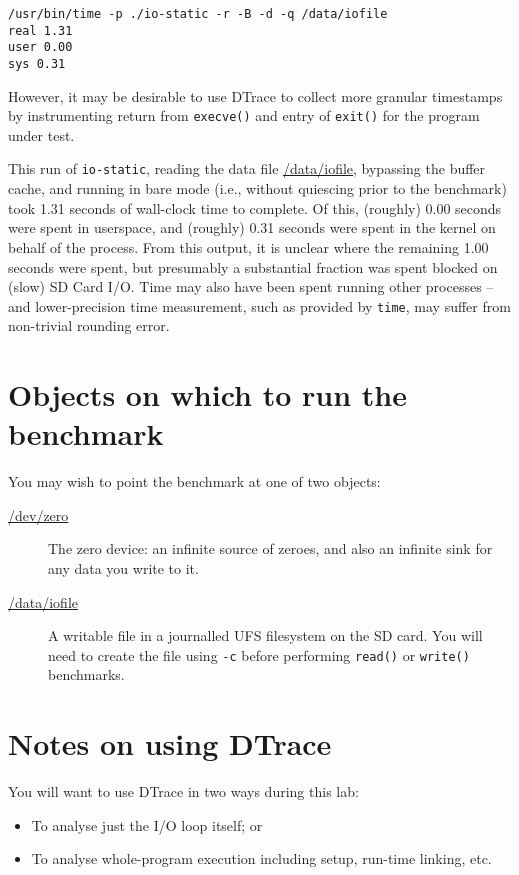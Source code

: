 \documentclass[a4paper,10pt]{article}
\begin{document}
\begin{verbatim}
/usr/bin/time -p ./io-static -r -B -d -q /data/iofile
real 1.31
user 0.00
sys 0.31
\end{verbatim}

\noindent
However, it may be desirable to use DTrace to collect more granular timestamps
by instrumenting return from \texttt{execve()} and entry of \texttt{exit()}
for the program under test.

This run of \texttt{io-static}, reading the data file \url{/data/iofile},
bypassing the buffer cache, and running in bare mode (i.e., without quiescing
prior to the benchmark) took 1.31 seconds of wall-clock time to complete.
Of this, (roughly) 0.00 seconds were spent in userspace, and (roughly) 0.31
seconds were spent in the kernel on behalf of the process.
From this output, it is unclear where the remaining 1.00 seconds were spent,
but presumably a substantial fraction was spent blocked on (slow) SD Card I/O.
Time may also have been spent running other processes -- and lower-precision
time measurement, such as provided by \texttt{time}, may suffer from
non-trivial rounding error.

\section*{Objects on which to run the benchmark}

You may wish to point the benchmark at one of two objects:

\begin{description}
\item[\url{/dev/zero}] The zero device: an infinite source of zeroes, and also
  an infinite sink for any data you write to it.

\item[\url{/data/iofile}] A writable file in a journalled UFS filesystem on
  the SD card.
  You will need to create the file using \texttt{-c} before performing
  \texttt{read()} or \texttt{write()} benchmarks.
\end{description}

\section*{Notes on using DTrace}

You will want to use DTrace in two ways during this lab:

\begin{itemize}
\item To analyse just the I/O loop itself; or
\item To analyse whole-program execution including setup, run-time linking,
  etc.
\end{itemize}
\end{document}
